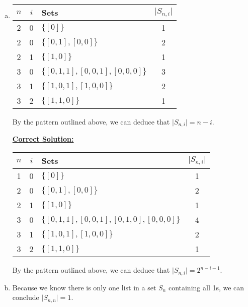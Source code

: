 \documentclass[12pt]{article}
\begin{document}
\begin{enumerate}[a.]
\begin{itemize}
    \end{itemize}

    \item

    \begin{tabular}{|c|c|l|c|}
        \hline
        $n$ & $i$ & Sets & $\lvert S_{n,i} \rvert$\\
        \hline
        2 & 0 & $\{[0]\}$ & 1\\
        \hline
        2 & 0 & $\{[0,1],[0,0]\}$ & 2\\
        \hline
        2 & 1 & $\{[1,0]\}$ & 1\\
        \hline
        3 & 0 & $\{[0,1,1],[0,0,1],[0,0,0]\}$ & 3\\
        \hline
        3 & 1 & $\{[1,0,1],[1,0,0]\}$ & 2\\
        \hline
        3 & 2 & $\{[1,1,0]\}$ & 1\\
        \hline
    \end{tabular}

    \bigskip

    By the pattern outlined above, we can deduce that $\lvert S_{n,i} \rvert = n - i$.

    \bigskip

    \begin{mdframed}
        \underline{\textbf{Correct Solution:}}

        \bigskip

        \begin{tabular}{|c|c|l|c|}
            \hline
            $n$ & $i$ & Sets & $\lvert S_{n,i} \rvert$\\
            \hline
            \color{red}1 & 0 & $\{[0]\}$ & 1\\
            \hline
            2 & 0 & $\{[0,1],[0,0]\}$ & 2\\
            \hline
            2 & 1 & $\{[1,0]\}$ & 1\\
            \hline
            3 & 0 & \color{red}$\{[0,1,1],[0,0,1],[0,1,0],[0,0,0]\}$ & \color{red}4\\
            \hline
            3 & 1 & $\{[1,0,1],[1,0,0]\}$ & 2\\
            \hline
            3 & 2 & $\{[1,1,0]\}$ & 1\\
            \hline
        \end{tabular}

        \bigskip

        By the pattern outlined above, we can deduce that \color{red}$\lvert S_{n,i} \rvert = 2^{n-i-1}$\color{black}.

    \end{mdframed}

    \item

    Because we know there is only one list in a set $S_{n}$ containing all 1s, we can conclude
    $\lvert S_{n,n} \rvert = 1$.


\end{enumerate}
\end{document}
